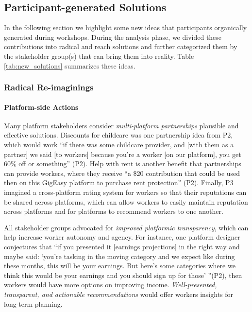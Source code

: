 
\FloatBarrier

\subsection{Participant-generated Solutions}
In the following section we highlight some new ideas that participants organically generated during workshops. During the analysis phase, we divided these contributions into radical and reach solutions and further categorized them by the stakeholder group(s) that can bring them into reality. Table \cref{tab:new_solutions} summarizes these ideas.


\subsubsection{Radical Re-imaginings}

\paragraph{Platform-side Actions} \label{platform_radical}
Many platform stakeholders consider \textit{multi-platform partnerships} plausible and effective solutions. Discounts for childcare was one partnership idea from P2, which would work ``if there was some childcare provider, and [with them as a partner] we said [to workers] because you're a worker [on our platform], you get 60\% off or something'' (P2). Help with rent is another benefit that partnerships can provide workers, where they receive ``a \$20 contribution that could be used then on this GigEasy platform to purchase rent protection'' (P2). Finally, P3 imagined a cross-platform rating system for workers so that their reputations can be shared across platforms, which can allow workers to easily maintain reputation across platforms and for platforms to recommend workers to one another.

All stakeholder groups advocated for \textit{improved platformic transparency}, which can help increase worker autonomy and agency. For instance, one platform designer conjectures that ``if you presented it [earnings projections] in the right way and maybe said: `you're tasking in the moving category and we expect like during these months, this will be your earnings. But here's some categories where we think this would be your earnings and you should sign up for those' ''(P2), then workers would have more options on improving income. \textit{Well-presented, transparent, and actionable recommendations} would offer workers insights for long-term planning. 

